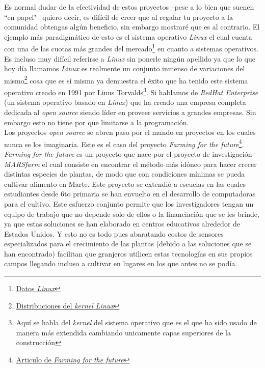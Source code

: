\documentclass{article}
\begin{document}
Es normal dudar de la efectividad de estos proyectos –pese a lo bien que suenen ``en papel"– quiero decir, es difícil de creer que al regalar tu proyecto a la comunidad obtengas algún beneficio, sin embargo mostraré que es al contrario. El ejemplo más paradigmático de esto es el sistema operativo \textit{Linux} el cual cuenta con una de las cuotas más grandes del mercado\footnote{\href{https://en.wikipedia.org/wiki/Usage_share_of_operating_systems\#Market_share_by_category}{Datos \textit{Linux}}} en cuanto a sistemas operativos. Es incluso muy difícil referirse a \textit{Linux} sin ponerle ningún apellido ya que lo que hoy día llamamos \textit{Linux} es realmente un conjunto inmenso de variaciones del mismo\footnote{\href{https://upload.wikimedia.org/wikipedia/commons/1/1b/Linux_Distribution_Timeline.svg}{Distribuciones del \textit{kernel Linux}}} cosa que es sí misma ya demuestra el éxito que ha tenido este sistema operativo creado en 1991 por Linus Torvalds\footnote{Aquí se habla del \textit{kernel} del sistema operativo que es el que ha sido usado de manera más extendida cambiando unicamente capas superiores de la construcción}. Si hablamos de \textit{RedHat Enterprise} (un sistema operativo basado en \textit{Linux}) que ha creado una empresa completa dedicada al \textit{open source} siendo líder en proveer servicios a grandes empresas. Sin embargo esto no tiene por que limitarse a la programación.\\

Los proyectos \textit{open source} se abren paso por el mundo en proyectos en los cuales nunca se los imaginaria. Este es el caso del proyecto \textit{Farming for the future}\footnote{\href{https://www.redhat.com/es/open-source-stories/farming-for-the-future}{Articulo de \textit{Farming for the future}}}. \textit{Farming for the future} es un proyecto que nace por el proyecto de investigación \textit{MARSfarm} el cual consiste en encontrar el método más idóneo para hacer crecer distintas especies de plantas, de modo que con condiciones mínimas se pueda cultivar alimento en Marte. Este proyecto se extendió a escuelas en las cuales estudiantes desde 6to primaria se han envuelto en el desarrollo de computadoras para el cultivo. Este esfuerzo conjunto permite que los investigadores tengan un equipo de trabajo que no depende solo de ellos o la financiación que se les brinde, ya que estas soluciones se han elaborado en centros educativos alrededor de Estados Unidos. Y esto no es todo pues abaratando costos de sensores especializados para el crecimiento de las plantas (debido a las soluciones que se han encontrado) facilitan que granjeros utilicen estas tecnologías en sus propios campos llegando incluso a cultivar en lugares en los que antes no se podía.\\
\end{document}
